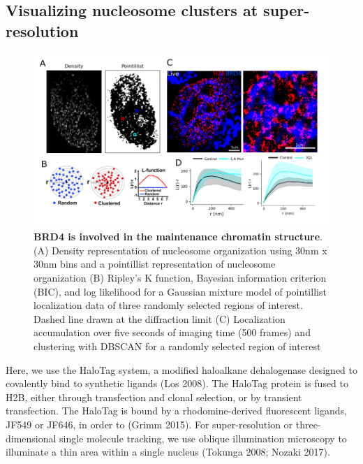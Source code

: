 \documentclass{ucetd}
\begin{document}
\subsection{Visualizing nucleosome clusters at super-resolution}

\begin{figure}
\begin{center}
\includegraphics[width=16cm]{BRD4-Results.png}
\end{center}
\caption{\textbf{BRD4 is involved in the maintenance chromatin structure}. (A) Density representation of nucleosome organization using 30nm x 30nm bins and a pointillist representation of nucleosome organization (B) Ripley's K function, Bayesian information criterion (BIC), and log likelihood for a Gaussian mixture model of pointillist localization data of three randomly selected regions of interest. Dashed line drawn at the diffraction limit (C) Localization accumulation over five seconds of imaging time (500 frames) and clustering with DBSCAN for a randomly selected region of interest}
\end{figure}

Here, we use the HaloTag system, a modified haloalkane dehalogenase designed to covalently bind to synthetic ligands  (Los 2008). The HaloTag protein is fused to H2B, either through transfection and clonal selection, or by transient transfection. The HaloTag is bound by a rhodomine-derived fluorescent ligands, JF549 or JF646, in order to (Grimm 2015). For super-resolution or three-dimensional single molecule tracking, we use oblique illumination microscopy to illuminate a thin area within a single nucleus (Tokunga 2008; Nozaki 2017). 
\end{document}
